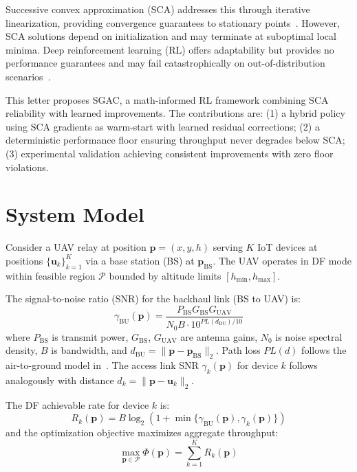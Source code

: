 \documentclass[journal]{IEEEtran}
\begin{document}
Successive convex approximation (SCA) addresses this through iterative linearization, providing convergence guarantees to stationary points~\cite{sun2017}. However, SCA solutions depend on initialization and may terminate at suboptimal local minima. Deep reinforcement learning (RL) offers adaptability but provides no performance guarantees and may fail catastrophically on out-of-distribution scenarios~\cite{dulac2021}.

This letter proposes SGAC, a math-informed RL framework combining SCA reliability with learned improvements. The contributions are: (1) a hybrid policy using SCA gradients as warm-start with learned residual corrections; (2) a deterministic performance floor ensuring throughput never degrades below SCA; (3) experimental validation achieving consistent improvements with zero floor violations.

\section{System Model}

Consider a UAV relay at position $\mathbf{p} = (x, y, h)$ serving $K$ IoT devices at positions $\{\mathbf{u}_k\}_{k=1}^K$ via a base station (BS) at $\mathbf{p}_{\text{BS}}$. The UAV operates in DF mode within feasible region $\mathcal{P}$ bounded by altitude limits $[h_{\min}, h_{\max}]$.

The signal-to-noise ratio (SNR) for the backhaul link (BS to UAV) is:
\begin{equation}
\gamma_{\text{BU}}(\mathbf{p}) = \frac{P_{\text{BS}} G_{\text{BS}} G_{\text{UAV}}}{N_0 B \cdot 10^{PL(d_{\text{BU}})/10}}
\label{eq:snr_bu}
\end{equation}
where $P_{\text{BS}}$ is transmit power, $G_{\text{BS}}$, $G_{\text{UAV}}$ are antenna gains, $N_0$ is noise spectral density, $B$ is bandwidth, and $d_{\text{BU}} = \|\mathbf{p} - \mathbf{p}_{\text{BS}}\|_2$. Path loss $PL(d)$ follows the air-to-ground model in~\cite{alhourani2014}. The access link SNR $\gamma_k(\mathbf{p})$ for device $k$ follows analogously with distance $d_k = \|\mathbf{p} - \mathbf{u}_k\|_2$.

The DF achievable rate for device $k$ is:
\begin{equation}
R_k(\mathbf{p}) = B \log_2\left(1 + \min\{\gamma_{\text{BU}}(\mathbf{p}), \gamma_{k}(\mathbf{p})\}\right)
\label{eq:rate}
\end{equation}
and the optimization objective maximizes aggregate throughput:
\begin{equation}
\max_{\mathbf{p} \in \mathcal{P}} \Phi(\mathbf{p}) = \sum_{k=1}^{K} R_k(\mathbf{p})
\label{eq:objective}
\end{equation}
\end{document}
